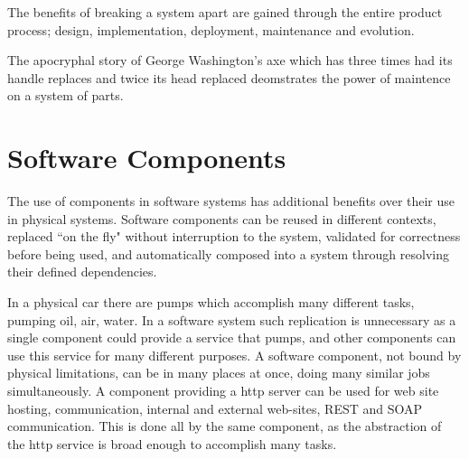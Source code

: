 \documentclass[a4paper]{report}
\begin{document}
The benefits of breaking a system apart are gained through the entire product process; design, implementation, deployment, maintenance and evolution.



The apocryphal story of George Washington's axe which has three times had its handle replaces and twice its head replaced deomstrates the power of maintence on a system of parts.


\section{Software Components}
{}The use of components in software systems has additional benefits over their use in physical systems.
{}Software components can be reused in different contexts, replaced ``on the fly" without interruption to the system, validated for correctness before being used, 
{}and automatically composed into a system through resolving their defined dependencies.

In a physical car there are pumps which accomplish many different tasks, pumping oil, air, water.
In a software system such replication is unnecessary as a single component could provide a service that pumps, 
and other components can use this service for many different purposes.
A software component, not bound by physical limitations, can be in many places at once, doing many similar jobs simultaneously.
A component providing a http server can be used for web site hosting, communication, internal and external web-sites, REST and SOAP communication.
This is done all by the same component, as the abstraction of the http service is broad enough to accomplish many tasks.
\end{document}

